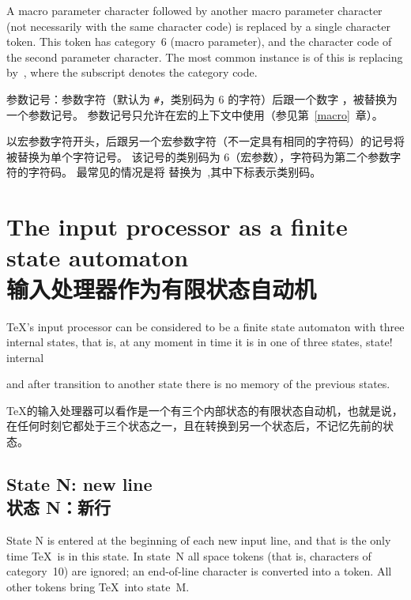 \begin{itemize}
A macro parameter character followed by another macro parameter
character (not necessarily with the same character code)
is replaced by a single character token.
This token has category~6 (macro parameter), and the character
code of the second parameter character.
The most common instance is of this is
replacing \n{\#\#} by~, where the subscript
denotes the category code.

参数记号：参数字符（默认为 \verb=#=，类别码为 6 的字符）后跟一个数字 ，被替换为一个参数记号。
参数记号只允许在宏的上下文中使用（参见第~\ref{macro}~章）。

以宏参数字符开头，后跟另一个宏参数字符（不一定具有相同的字符码）的记号将被替换为单个字符记号。
该记号的类别码为 6（宏参数），字符码为第二个参数字符的字符码。
最常见的情况是将 \n{\#\#} 替换为~,其中下标表示类别码。
\end{itemize}


\section{The input processor as a finite state automaton\\输入处理器作为有限状态自动机}
\label{input:states}

\TeX's input processor can be considered to be a finite state 
automaton with three internal states,
that is, at any moment in time it is in one of three states,
\term state! internal\par
and after transition to another state there is no memory of the
\awp
previous states. 

\TeX 的输入处理器可以看作是一个有三个内部状态的有限状态自动机，也就是说，在任何时刻它都处于三个状态之一，且在转换到另一个状态后，不记忆先前的状态。


\subsection{State {\italic N}: new line\\状态 {\italic N}：新行}

State {\italic N} is entered at the beginning of each new input line,
and that is the only time \TeX\ is in this state.
In state~{\italic N} all space tokens (that is, characters of category~10)
are ignored; an end-of-line character is converted
into a  token.
All other tokens bring \TeX\ into state~{\italic M}.

